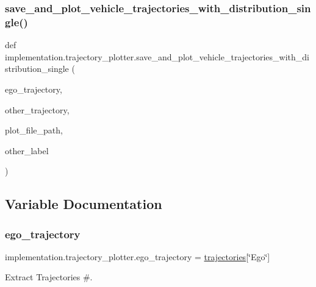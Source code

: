 \subsubsection{\texorpdfstring{save\+\_\+and\+\_\+plot\+\_\+vehicle\+\_\+trajectories\+\_\+with\+\_\+distribution\+\_\+single()}{save\_and\_plot\_vehicle\_trajectories\_with\_distribution\_single()}}
{\footnotesize\ttfamily def implementation.\+trajectory\+\_\+plotter.\+save\+\_\+and\+\_\+plot\+\_\+vehicle\+\_\+trajectories\+\_\+with\+\_\+distribution\+\_\+single (\begin{DoxyParamCaption}\item[{}]{ego\+\_\+trajectory,  }\item[{}]{other\+\_\+trajectory,  }\item[{}]{plot\+\_\+file\+\_\+path,  }\item[{}]{other\+\_\+label }\end{DoxyParamCaption})}



\subsection{Variable Documentation}
\mbox{\label{namespaceimplementation_1_1trajectory__plotter_a67f2155d9cf9a5d23184e9a8331fa9c5}} 
\subsubsection{\texorpdfstring{ego\+\_\+trajectory}{ego\_trajectory}}
{\footnotesize\ttfamily implementation.\+trajectory\+\_\+plotter.\+ego\+\_\+trajectory = \hyperlink{namespaceimplementation_1_1trajectory__plotter_a67e6bdba78400aff3229d099a95259fb}{trajectories}\mbox{[}\char`\"{}Ego\char`\"{}\mbox{]}}



Extract Trajectories \#. 

\mbox{\label{namespaceimplementation_1_1trajectory__plotter_a230271bc03fa2b0dc367f3c14e161d39}} 
